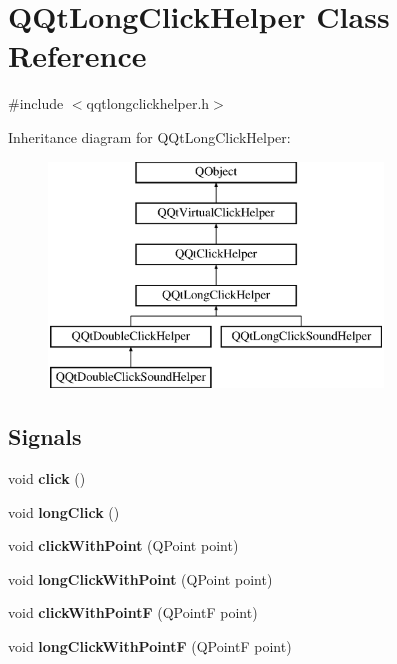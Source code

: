 \hypertarget{class_q_qt_long_click_helper}{}\section{Q\+Qt\+Long\+Click\+Helper Class Reference}
\label{class_q_qt_long_click_helper}


{\ttfamily \#include $<$qqtlongclickhelper.\+h$>$}

Inheritance diagram for Q\+Qt\+Long\+Click\+Helper\+:\begin{figure}[H]
\begin{center}
\leavevmode
\includegraphics[height=6.000000cm]{class_q_qt_long_click_helper}
\end{center}
\end{figure}
\subsection*{Signals}
\begin{DoxyCompactItemize}
\item 
\mbox{\label{class_q_qt_long_click_helper_a69ea400df720f9e6f88f4966bd2a3d5a}} 
void {\bfseries click} ()
\item 
\mbox{\label{class_q_qt_long_click_helper_ada7e782fbdf9532c81262a21bf2b59a4}} 
void {\bfseries long\+Click} ()
\item 
\mbox{\label{class_q_qt_long_click_helper_a66f0e1a12b8507fd540128722c10d31f}} 
void {\bfseries click\+With\+Point} (Q\+Point point)
\item 
\mbox{\label{class_q_qt_long_click_helper_a97a0166ddb6b9e8e1991b4da6e00c7c7}} 
void {\bfseries long\+Click\+With\+Point} (Q\+Point point)
\item 
\mbox{\label{class_q_qt_long_click_helper_a213f7f6be32c38b0ec13a08d0d3fc509}} 
void {\bfseries click\+With\+PointF} (Q\+PointF point)
\item 
\mbox{\label{class_q_qt_long_click_helper_ae15a68619cf26e0ac5087cfeaa8733a4}} 
void {\bfseries long\+Click\+With\+PointF} (Q\+PointF point)
\end{DoxyCompactItemize}
